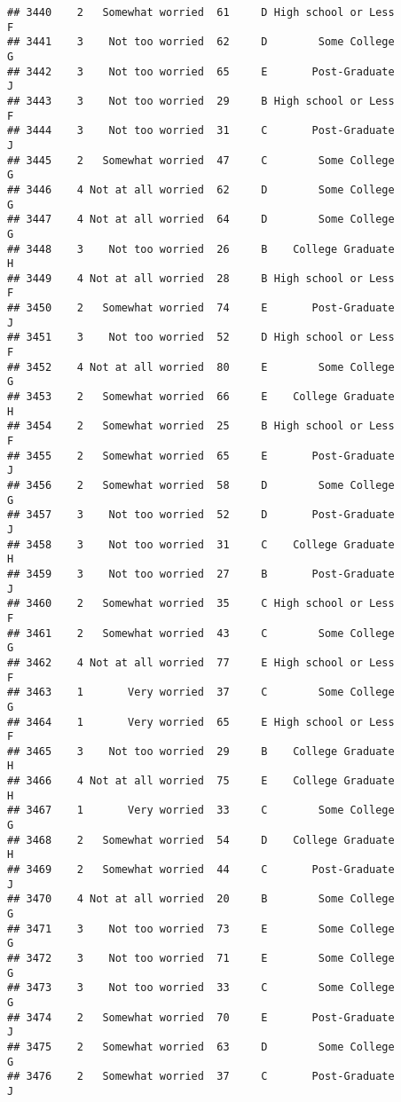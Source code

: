 \documentclass[
]{article}
\begin{document}
\begin{verbatim}
## 3440    2   Somewhat worried  61     D High school or Less         F
## 3441    3    Not too worried  62     D        Some College         G
## 3442    3    Not too worried  65     E       Post-Graduate         J
## 3443    3    Not too worried  29     B High school or Less         F
## 3444    3    Not too worried  31     C       Post-Graduate         J
## 3445    2   Somewhat worried  47     C        Some College         G
## 3446    4 Not at all worried  62     D        Some College         G
## 3447    4 Not at all worried  64     D        Some College         G
## 3448    3    Not too worried  26     B    College Graduate         H
## 3449    4 Not at all worried  28     B High school or Less         F
## 3450    2   Somewhat worried  74     E       Post-Graduate         J
## 3451    3    Not too worried  52     D High school or Less         F
## 3452    4 Not at all worried  80     E        Some College         G
## 3453    2   Somewhat worried  66     E    College Graduate         H
## 3454    2   Somewhat worried  25     B High school or Less         F
## 3455    2   Somewhat worried  65     E       Post-Graduate         J
## 3456    2   Somewhat worried  58     D        Some College         G
## 3457    3    Not too worried  52     D       Post-Graduate         J
## 3458    3    Not too worried  31     C    College Graduate         H
## 3459    3    Not too worried  27     B       Post-Graduate         J
## 3460    2   Somewhat worried  35     C High school or Less         F
## 3461    2   Somewhat worried  43     C        Some College         G
## 3462    4 Not at all worried  77     E High school or Less         F
## 3463    1       Very worried  37     C        Some College         G
## 3464    1       Very worried  65     E High school or Less         F
## 3465    3    Not too worried  29     B    College Graduate         H
## 3466    4 Not at all worried  75     E    College Graduate         H
## 3467    1       Very worried  33     C        Some College         G
## 3468    2   Somewhat worried  54     D    College Graduate         H
## 3469    2   Somewhat worried  44     C       Post-Graduate         J
## 3470    4 Not at all worried  20     B        Some College         G
## 3471    3    Not too worried  73     E        Some College         G
## 3472    3    Not too worried  71     E        Some College         G
## 3473    3    Not too worried  33     C        Some College         G
## 3474    2   Somewhat worried  70     E       Post-Graduate         J
## 3475    2   Somewhat worried  63     D        Some College         G
## 3476    2   Somewhat worried  37     C       Post-Graduate         J

\end{verbatim}
\end{document}
